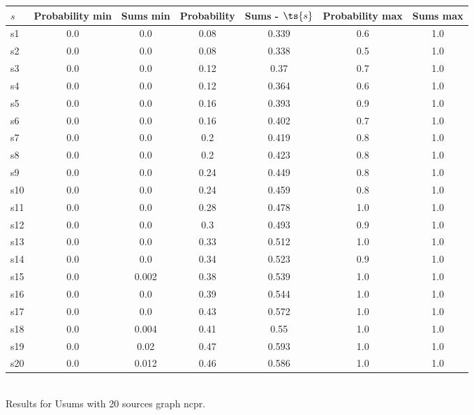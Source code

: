 \documentclass{article}
\begin{document}
\noindent\begin{tabular}{|l|c|c|c|c|c|c|}
\hline
$s$& Probability min & Sums min & Probability & Sums - $\ts{s}$ & Probability max & Sums max\\
\hline
s1 &0.0 & 0.0 & 0.08 & 0.339 & 0.6 & 1.0\\
\hline
s2 &0.0 & 0.0 & 0.08 & 0.338 & 0.5 & 1.0\\
\hline
s3 &0.0 & 0.0 & 0.12 & 0.37 & 0.7 & 1.0\\
\hline
s4 &0.0 & 0.0 & 0.12 & 0.364 & 0.6 & 1.0\\
\hline
s5 &0.0 & 0.0 & 0.16 & 0.393 & 0.9 & 1.0\\
\hline
s6 &0.0 & 0.0 & 0.16 & 0.402 & 0.7 & 1.0\\
\hline
s7 &0.0 & 0.0 & 0.2 & 0.419 & 0.8 & 1.0\\
\hline
s8 &0.0 & 0.0 & 0.2 & 0.423 & 0.8 & 1.0\\
\hline
s9 &0.0 & 0.0 & 0.24 & 0.449 & 0.8 & 1.0\\
\hline
s10 &0.0 & 0.0 & 0.24 & 0.459 & 0.8 & 1.0\\
\hline
s11 &0.0 & 0.0 & 0.28 & 0.478 & 1.0 & 1.0\\
\hline
s12 &0.0 & 0.0 & 0.3 & 0.493 & 0.9 & 1.0\\
\hline
s13 &0.0 & 0.0 & 0.33 & 0.512 & 1.0 & 1.0\\
\hline
s14 &0.0 & 0.0 & 0.34 & 0.523 & 0.9 & 1.0\\
\hline
s15 &0.0 & 0.002 & 0.38 & 0.539 & 1.0 & 1.0\\
\hline
s16 &0.0 & 0.0 & 0.39 & 0.544 & 1.0 & 1.0\\
\hline
s17 &0.0 & 0.0 & 0.43 & 0.572 & 1.0 & 1.0\\
\hline
s18 &0.0 & 0.004 & 0.41 & 0.55 & 1.0 & 1.0\\
\hline
s19 &0.0 & 0.02 & 0.47 & 0.593 & 1.0 & 1.0\\
\hline
s20 &0.0 & 0.012 & 0.46 & 0.586 & 1.0 & 1.0\\
\hline
\end{tabular}\\

\noindent Results for Usums with 20 sources graph ncpr.
\end{document}
